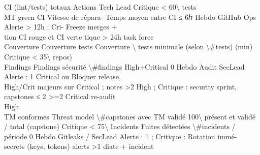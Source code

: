 \documentclass[12pt,landscape,a4paper]{article}
\begin{document}
CI (lint/tests)    totaux                                           Actions    Tech Lead Critique \textless{} 60\textbackslash{}%
tests\\
MT green CI    Vitesse de répara- Temps moyen entre CI       ≤ 6ℎ       Hebdo      GitHub     Ops       Alerte \textgreater{} 12h ; Cri-       Freeze merges +\\
tion CI            rouge et CI verte                                                     tique \textgreater{} 24h               task force\\
Couverture     Couverture tests Couverture \textbackslash{}%
tests          minimale (selon \textbackslash{}#tests)                       (min)                                      Critique \textless{} 35\textbackslash{}%
repos)\\
Findings       Findings sécurité \textbackslash{}#findings High+Critical     0          Hebdo      Audit      SecLead   Alerte : 1 Critical ou    Bloquer release,\\
High/Crit      majeurs sur                                   Critical ;            notes                \textgreater{}2 High ; Critique :      security sprint,\\
capstones                                     ≤ 2                                        \textgreater{}=2 Critical              re-audit\\
High\\
TM conformes Threat model         \textbackslash{}#capstones avec TM validé 100\textbackslash{}%
présent et validé    / total                               (capstone)                      Critique \textless{} 75\textbackslash{}%
Incidents    Fuites détectées     \textbackslash{}#incidents / période      0           Hebdo      Gitleaks / SecLead   Alerte : 1 ; Critique :   Rotation immé-\\
secrets      (keys, tokens)                                                        alerts               \textgreater{}1                        diate + incident\\
\end{document}
